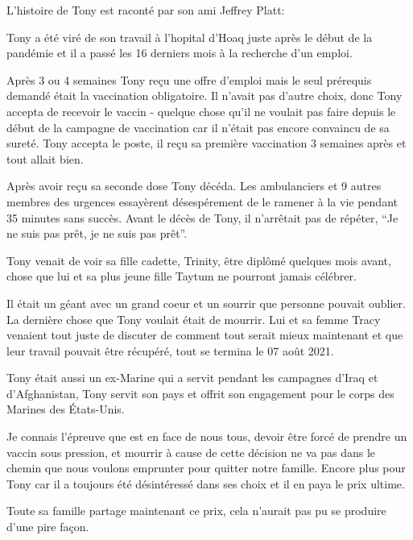 L'histoire de Tony est raconté par son ami Jeffrey Platt:

Tony a été viré de son travail à l'hopital d'Hoaq juste après le début de la
pandémie et il a passé les 16 derniers mois à la recherche d'un emploi.

Après 3 ou 4 semaines Tony reçu une offre d'emploi mais le seul prérequis
demandé était la vaccination obligatoire. Il n'avait pas d'autre choix, donc
Tony accepta de recevoir le vaccin - quelque chose qu'il ne voulait pas faire
depuis le début de la campagne de vaccination car il n'était pas encore
convaincu de sa sureté. Tony accepta le poste, il reçu sa première vaccination 3
semaines après et tout allait bien.

Après avoir reçu sa seconde dose Tony décéda. Les ambulanciers et 9 autres
membres des urgences essayèrent désespérement de le ramener à la vie pendant 35
minutes sans succès. Avant le décès de Tony, il n'arrêtait pas de répéter, “Je
ne suis pas prêt, je ne suis pas prêt”.

Tony venait de voir sa fille cadette, Trinity, être diplômé quelques mois avant,
chose que lui et sa plus jeune fille Taytum ne pourront jamais célébrer.

Il était un géant avec un grand coeur et un sourrir que personne pouvait
oublier. La dernière chose que Tony voulait était de mourrir. Lui et sa femme
Tracy venaient tout juste de discuter de comment tout serait mieux maintenant et
que leur travail pouvait être récupéré, tout se termina le 07 août 2021.

Tony était aussi un ex-Marine qui a servit pendant les campagnes d'Iraq et
d'Afghanistan, Tony servit son pays et offrit son engagement pour le corps des
Marines des États-Unis.

Je connais l'épreuve que est en face de nous tous, devoir être forcé de prendre
un vaccin sous pression, et mourrir à cause de cette décision ne va pas dans le
chemin que nous voulons emprunter pour quitter notre famille. Encore plus pour
Tony car il a toujours été désintéressé dans ses choix et il en paya le prix
ultime.

Toute sa famille partage maintenant ce prix, cela n'aurait pas pu se produire
d'une pire façon.

